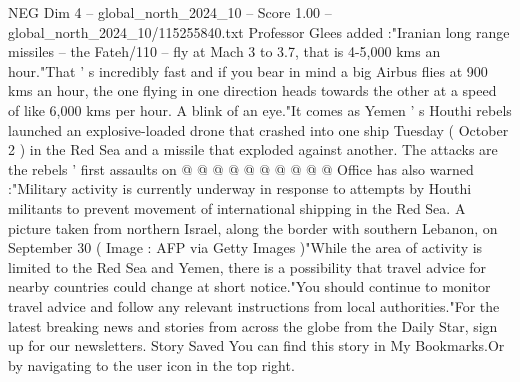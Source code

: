 \begin{textsample}{NEG Dim 4 – global\_north\_2024\_10 – Score 1.00 – global\_north\_2024\_10/115255840.txt}
Professor Glees added :"Iranian long range missiles -- the Fateh/110 -- fly at Mach 3 to 3.7, that is 4-5,000 kms an hour."That ' s incredibly fast and if you bear in mind a big Airbus flies at 900 kms an hour, the one flying in one direction heads towards the other at a speed of like 6,000 kms per hour.
A blink of an eye."It comes as Yemen ' s Houthi rebels launched an explosive-loaded drone that crashed into one ship Tuesday ( October 2 ) in the Red Sea and a missile that exploded against another.
The attacks are the rebels ' first assaults on @ @ @ @ @ @ @ @ @ @ Office has also warned :"Military activity is currently underway in response to attempts by Houthi militants to prevent movement of international shipping in the Red Sea.
A picture taken from northern Israel, along the border with southern Lebanon, on September 30 ( Image : AFP via Getty Images )"While the area of activity is limited to the Red Sea and Yemen, there is a possibility that travel advice for nearby countries could change at short notice."You should continue to monitor travel advice and follow any relevant instructions from local authorities."For the latest breaking news and stories from across the globe from the Daily Star, sign up for our newsletters.
Story Saved You can find this story in My Bookmarks.Or by navigating to the user icon in the top right.

\end{textsample}
